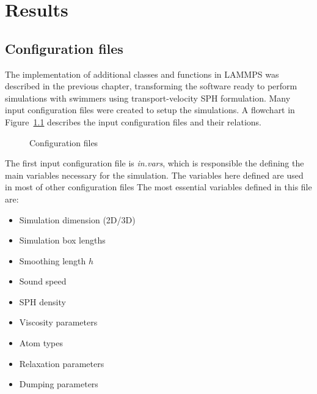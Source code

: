 

\chapter{Results}
\label{chap:chapter_4}



\section{Configuration files}
\label{sec:section 1}

The implementation of additional classes and functions in LAMMPS was described in the previous chapter, transforming the software ready to perform simulations with swimmers using
transport-velocity SPH formulation. Many input configuration files were created to setup the simulations. A flowchart in Figure~\ref{fig:Bild4.1} describes the input configuration
files and their relations.

\begin{figure}[H]
\centering
  \begin{footnotesize}
  
  \caption[Configuration files]{Configuration files}
  \label{fig:Bild4.1}
  \end{footnotesize}
\end{figure} 

The first input configuration file is \textit{in.vars}, which is responsible the defining the main variables necessary for the simulation. The variables here defined are used in most of other configuration files 
The most essential variables defined in this file are:

\begin{itemize}
  \item Simulation dimension (2D/3D)
  \item Simulation box lengths
  \item Smoothing length $h$
  \item Sound speed
  \item SPH density
  \item Viscosity parameters
  \item Atom types
  \item Relaxation parameters
  \item Dumping parameters
\end{itemize}


